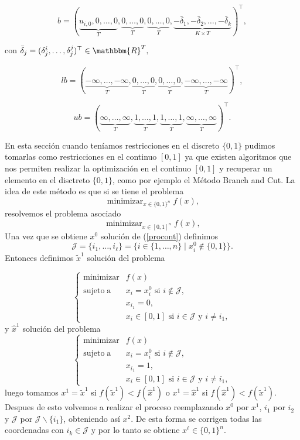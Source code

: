 \documentclass[a4paper,12pt]{report}
\newcommand{\RR}{\mathbbm{R}}
\newcounter{ejemplo}
\begin{document}
$$b=( \underbrace{u_{i,0},0,\ldots,0}_T, \underbrace{0,\ldots,0}_T, \underbrace{0,\ldots,0}_T, \underbrace{-\bar{\delta}_1,-\bar{\delta}_2,\ldots,-\bar{\delta}_k}_{K\times T})^\top,$$

con $\bar{\delta}_j=(\delta_j^i,\ldots,\delta_j^j)^\top\in\RR^T,$

$$lb=( \underbrace{-\infty,\ldots,-\infty}_T, \underbrace{0,\ldots,0}_T, \underbrace{0,\ldots,0}_T, \underbrace{-\infty,\ldots,-\infty}_T)^\top,$$

$$ub=( \underbrace{\infty,\ldots,\infty}_{T}, \underbrace{1,\ldots,1}_{T}, \underbrace{1,\ldots,1}_T, \underbrace{\infty,\ldots,\infty}_T)^\top.$$

En esta secci\'on cuando ten\'iamos restricciones en el discreto $\{0,1\}$ pudimos tomarlas como restricciones en el continuo $[0,1]$ ya que existen algoritmos que nos permiten realizar la optimizaci\'on en el continuo $[0,1]$ y recuperar un elemento en el disctreto $\{0,1\}$, como por ejemplo el M\'etodo Branch and Cut. La idea de este m\'etodo es que si se tiene el problema 
\begin{equation}\label{prodis}
\mathop{\mathrm{minimizar}}_{x\in\{0,1\}^n} f(x),
\end{equation}
resolvemos el problema asociado
\begin{equation}\label{procont}
\mathop{\mathrm{minimizar}}_{x\in[0,1]^n} f(x),
\end{equation}
Una vez que se obtiene $x^0$ soluci\'on de (\ref{procont}) definimos $$\mathcal{J}=\{i_1,\ldots,i_\ell\}=\{i\in\{1,\ldots,n\}\mid x^0_i\notin\{0,1\}\}.$$ Entonces definimos $\tilde{x}^1$ soluci\'on del problema 

\begin{equation}
\left\{
 \begin{array}{rl}
  \displaystyle\mathop{\mathrm{minimizar}} & f(x)\\
  \mathrm{sujeto\;a}& x_i=x_i^0 \mbox{ si } i\notin\mathcal{J},\\
						  & x_{i_1}=0,\\
						  & x_i\in[0,1]\mbox{ si } i\in\mathcal{J}\mbox{ y } i\neq i_1, 
 \end{array}
\right.
\end{equation}
y $\hat{x}^1$ soluci\'on del problema 
\begin{equation}
\left\{
 \begin{array}{rl}
  \displaystyle\mathop{\mathrm{minimizar}} & f(x)\\
  \mathrm{sujeto\;a}& x_i=x_i^0 \mbox{ si } i\notin\mathcal{J},\\
						  & x_{i_1}=1,\\
						  & x_i\in[0,1]\mbox{ si } i\in\mathcal{J}\mbox{ y } i\neq i_1, 
 \end{array}
\right.
\end{equation}
luego tomamos $x^1=\tilde{x}^1$ si $f(\tilde{x}^1)<f(\hat{x}^1)$ o $x^1=\hat{x}^1$ si $f(\hat{x}^1)<f(\tilde{x}^1)$.
Despues de esto volvemos a realizar el proceso reemplazando $x^0$ por $x^1$, $i_1$ por $i_2$ y $\mathcal{J}$ por $\mathcal{J}\backslash\{i_1\}$, obteniendo as\'i $x^2$. De esta forma se corrigen todas las coordenadas con $i_k\in\mathcal{J}$ y por lo tanto se obtiene $x^\ell\in\{0,1\}^n$.
\end{document}
